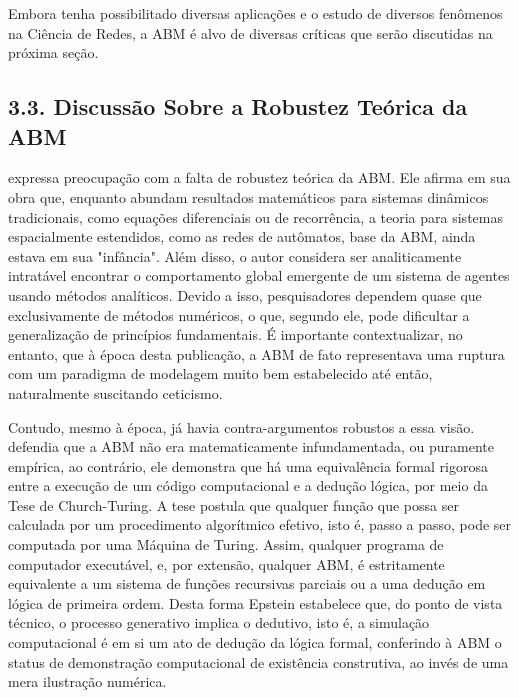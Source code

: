 \documentclass[12pt,oneside,a4paper,brazil,sumario=tradicional]{abntex2}
\begin{document}
Embora tenha possibilitado diversas aplicações e o estudo de diversos fenômenos na Ciência de Redes, a ABM é alvo de diversas críticas que serão discutidas na próxima seção.

\subsection*{3.3. Discussão Sobre a Robustez Teórica da ABM}
\textcite{boccara2004} expressa preocupação com a falta de robustez teórica da ABM. Ele afirma em sua obra que, enquanto abundam resultados matemáticos para sistemas dinâmicos tradicionais, como equações diferenciais ou de recorrência, a teoria para sistemas espacialmente estendidos, como as redes de autômatos, base da ABM, ainda estava em sua "infância". Além disso, o autor considera ser analiticamente intratável encontrar o comportamento global emergente de um sistema de agentes usando métodos analíticos. Devido a isso, pesquisadores dependem quase que exclusivamente de métodos numéricos, o que, segundo ele, pode dificultar a generalização de princípios fundamentais. É importante contextualizar, no entanto, que à época desta publicação, a ABM de fato representava uma ruptura com um paradigma de modelagem muito bem estabelecido até então, naturalmente suscitando ceticismo.

Contudo, mesmo à época, já havia contra-argumentos robustos a essa visão. \textcite{epstein1999} defendia que a ABM não era matematicamente infundamentada, ou puramente empírica, ao contrário, ele demonstra que há uma equivalência formal rigorosa entre a execução de um código computacional e a dedução lógica, por meio da Tese de Church-Turing. A tese postula que qualquer função que possa ser calculada por um procedimento algorítmico efetivo, isto é, passo a passo, pode ser computada por uma Máquina de Turing. Assim, qualquer programa de computador executável, e, por extensão, qualquer ABM, é estritamente equivalente a um sistema de funções recursivas parciais ou a uma dedução em lógica de primeira ordem. Desta forma Epstein estabelece que, do ponto de vista técnico, o processo generativo implica o dedutivo, isto é, a simulação computacional é em si um ato de dedução da lógica formal, conferindo à ABM o status de demonstração computacional de existência construtiva, ao invés de uma mera ilustração numérica.
\end{document}
